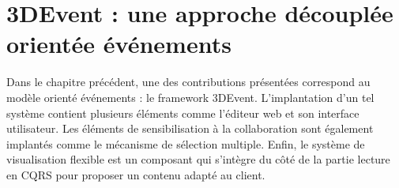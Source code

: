 




\section{3DEvent : une approche découplée orientée événements}
\label{sec:3DEvent}
Dans le chapitre précédent, une des contributions présentées correspond au 
modèle orienté événements : le \gls{framework} 3DEvent. 
L'implantation d'un tel système contient plusieurs éléments comme l'éditeur 
web et son interface utilisateur. Les éléments de sensibilisation à la collaboration 
sont également implantés comme le mécanisme de sélection multiple. Enfin, le 
système de visualisation flexible est un composant qui s'intègre du côté de la 
partie lecture en \gls{CQRS} pour proposer un contenu adapté au client. 



